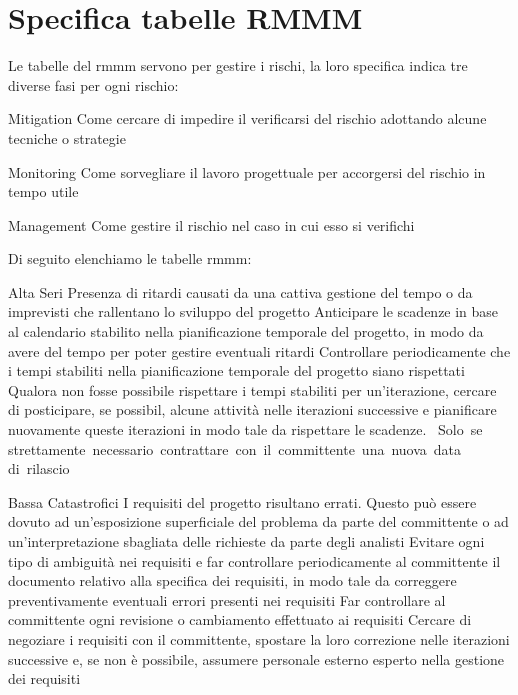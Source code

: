 \section{Specifica tabelle RMMM}
Le tabelle del \gls{rmmm} servono per gestire i rischi, la loro specifica indica tre diverse fasi per ogni rischio:
\begin{descriptionInd}
	\item[Mitigation] Come cercare di impedire il verificarsi del rischio adottando alcune tecniche o strategie
	\item[Monitoring] Come sorvegliare il lavoro progettuale per accorgersi del rischio in tempo utile
	\item[Management] Come gestire il rischio nel caso in cui esso si verifichi
\end{descriptionInd}
Di seguito elenchiamo le tabelle \gls{rmmm}:

{Alta}
{Seri}
{Presenza di ritardi causati da una cattiva gestione del tempo o da imprevisti che rallentano lo sviluppo del progetto}
{Anticipare le scadenze in base al calendario stabilito nella pianificazione temporale del progetto, in modo da avere del tempo per poter gestire eventuali ritardi}
{Controllare periodicamente che i tempi stabiliti nella pianificazione temporale del progetto siano rispettati}
{Qualora non fosse possibile rispettare i tempi stabiliti per un'iterazione, cercare di posticipare, se possibil, alcune attività nelle iterazioni successive e pianificare nuovamente queste iterazioni in modo tale da rispettare le scadenze.  Solo se strettamente necessario contrattare con il committente una nuova data  di rilascio}


{Bassa}
{Catastrofici}
{I requisiti del progetto risultano errati. Questo può essere dovuto ad un'esposizione superficiale del problema da parte del committente o ad un'interpretazione sbagliata delle richieste da parte degli analisti}
{Evitare ogni tipo di ambiguità nei requisiti e far controllare periodicamente al committente il documento relativo alla specifica dei requisiti, in modo tale da correggere preventivamente eventuali errori presenti nei requisiti}
{Far controllare al committente ogni revisione o cambiamento effettuato ai requisiti}
{Cercare di negoziare i requisiti con il committente, spostare la loro correzione nelle iterazioni successive e, se non è possibile, assumere personale esterno esperto nella gestione dei requisiti}


